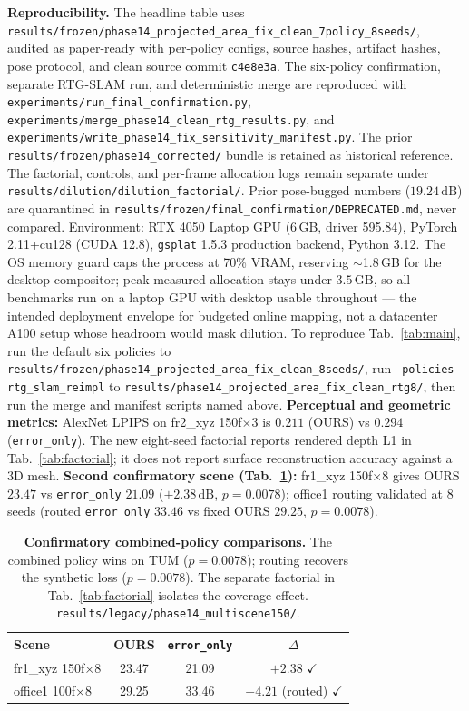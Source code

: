 \documentclass[10pt,twocolumn,letterpaper]{article}
\begin{document}
\textbf{Reproducibility.} The headline table uses \texttt{results/frozen/phase14\_projected\_area\_fix\_clean\_7policy\_8seeds/}, audited as paper-ready with per-policy configs, source hashes, artifact hashes, pose protocol, and clean source commit \texttt{c4e8e3a}. The six-policy confirmation, separate RTG-SLAM run, and deterministic merge are reproduced with \texttt{experiments/run\_final\_confirmation.py}, \texttt{experiments/merge\_phase14\_clean\_rtg\_results.py}, and \texttt{experiments/write\_phase14\_fix\_sensitivity\_manifest.py}. The prior \texttt{results/frozen/phase14\_corrected/} bundle is retained as historical reference. The factorial, controls, and per-frame allocation logs remain separate under \texttt{results/dilution/dilution\_factorial/}. Prior pose-bugged numbers ($19.24\,\mathrm{dB}$) are quarantined in \texttt{results/frozen/final\_confirmation/DEPRECATED.md}, never compared.
Environment: RTX 4050 Laptop GPU (6\,GB, driver 595.84), PyTorch 2.11+cu128 (CUDA 12.8), \texttt{gsplat} 1.5.3 production backend, Python 3.12.
The OS memory guard caps the process at 70\% VRAM, reserving $\sim$1.8\,GB for the desktop compositor; peak measured allocation stays under $3.5\,\mathrm{GB}$, so all benchmarks run on a laptop GPU with desktop usable throughout --- the intended deployment envelope for budgeted online mapping, not a datacenter A100 setup whose headroom would mask dilution.
To reproduce Tab.~\ref{tab:main}, run the default six policies to \texttt{results/frozen/phase14\_projected\_area\_fix\_clean\_8seeds/}, run \texttt{--policies rtg\_slam\_reimpl} to \texttt{results/phase14\_projected\_area\_fix\_clean\_rtg8/}, then run the merge and manifest scripts named above.
\textbf{Perceptual and geometric metrics:} AlexNet LPIPS on fr2\_xyz 150f$\times$3 is $0.211$ (OURS) vs $0.294$ (\texttt{error\_only}). The new eight-seed factorial reports rendered depth L1 in Tab.~\ref{tab:factorial}; it does not report surface reconstruction accuracy against a 3D mesh.
\textbf{Second confirmatory scene (Tab.~\ref{tab:confirm2}):} fr1\_xyz 150f$\times$8 gives OURS $23.47$ vs \texttt{error\_only} $21.09$ ($+2.38\,\mathrm{dB}$, $p=0.0078$); office1 routing validated at 8 seeds (routed \texttt{error\_only} $33.46$ vs fixed OURS $29.25$, $p=0.0078$).

\begin{table}[tbp]
\centering
\footnotesize\setlength{\tabcolsep}{3pt}
\begin{tabular}{lccc}
\toprule
\textbf{Scene} & \textbf{OURS} & \textbf{\texttt{error\_only}} & \textbf{$\Delta$} \\
\midrule
fr1\_xyz 150f$\times$8 & 23.47 & 21.09 & $+2.38$ $\checkmark$ \\
office1 100f$\times$8 & 29.25 & 33.46 & $-4.21$ (routed) $\checkmark$ \\
\bottomrule
\end{tabular}
\caption{\textbf{Confirmatory combined-policy comparisons.} The combined policy wins on TUM ($p=0.0078$); routing recovers the synthetic loss ($p=0.0078$). The separate factorial in Tab.~\ref{tab:factorial} isolates the coverage effect. \texttt{results/legacy/phase14\_multiscene150/}.}
\label{tab:confirm2}
\end{table}
\end{document}
